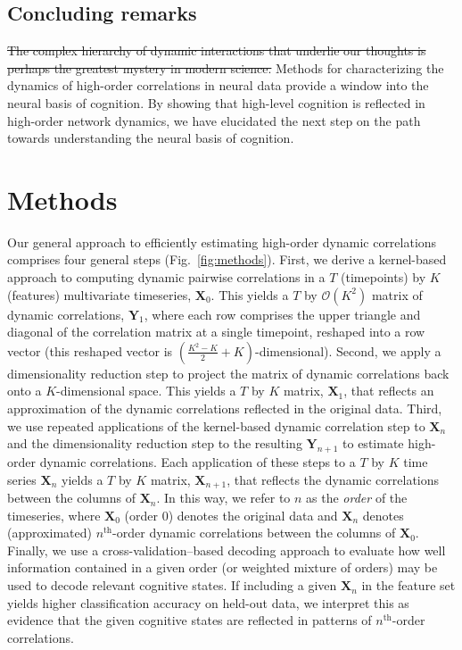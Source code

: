 \documentclass[english]{article}
\providecommand{\DIFdeltex}[1]{{\protect\color{red}\sout{#1}}}                      %
\providecommand{\DIFaddbegin}{} %
\providecommand{\DIFdelbegin}{} %
\providecommand{\DIFdelend}{} %
\providecommand{\DIFdel}[1]{\texorpdfstring{\DIFdeltex{#1}}{}} %
\newcommand{\DIFscaledelfig}{0.5}
\newlength{\DIFdelgraphicswidth} %
\newlength{\DIFdelgraphicsheight} %
\newcommand{\DIFaddincludegraphics}[2][]{{\color{blue}\fbox{\DIFOincludegraphics[#1]{#2}}}} %
\newcommand{\DIFdelincludegraphics}[2][]{%
\sbox{\DIFdelgraphicsbox}{\DIFOincludegraphics[#1]{#2}}%
\settoboxwidth{\DIFdelgraphicswidth}{\DIFdelgraphicsbox} %
\settoboxtotalheight{\DIFdelgraphicsheight}{\DIFdelgraphicsbox} %
\scalebox{\DIFscaledelfig}{%
\parbox[b]{\DIFdelgraphicswidth}{\usebox{\DIFdelgraphicsbox}\\[-\baselineskip] \rule{\DIFdelgraphicswidth}{0em}}\llap{\resizebox{\DIFdelgraphicswidth}{\DIFdelgraphicsheight}{%
\setlength{\unitlength}{\DIFdelgraphicswidth}%
\begin{picture}(1,1)%
\thicklines\linethickness{2pt} %
{\color[rgb]{1,0,0}\put(0,0){\framebox(1,1){}}}%
{\color[rgb]{1,0,0}\put(0,0){\line( 1,1){1}}}%
{\color[rgb]{1,0,0}\put(0,1){\line(1,-1){1}}}%
\end{picture}%
}\hspace*{3pt}}} %
} %
\DeclareRobustCommand{\DIFaddbegin}{\DIFOaddbegin \let\includegraphics\DIFaddincludegraphics} %
\DeclareRobustCommand{\DIFdelbegin}{\DIFOdelbegin \let\includegraphics\DIFdelincludegraphics} %
\DeclareRobustCommand{\DIFdelend}{\DIFOaddend \let\includegraphics\DIFOincludegraphics} %
\begin{document}
\subsection*{Concluding remarks}
\DIFdelbegin \DIFdel{The complex hierarchy of dynamic interactions that underlie our
thoughts is perhaps the greatest mystery in modern science.  }\DIFdelend Methods for characterizing the dynamics of high-order correlations in
neural data provide a window into the neural basis of cognition.  By
showing that high-level cognition is reflected in high-order network
dynamics, we have elucidated the next step on the path towards
understanding the neural basis of cognition.



\section*{Methods}
Our general approach to efficiently estimating high-order dynamic
correlations comprises four general steps (Fig.~\ref{fig:methods}).
First, we derive a kernel-based approach to computing dynamic pairwise
correlations in a $T$ (timepoints) by $K$ (features) multivariate
timeseries, $\mathbf{X}_0$.  This yields a $T$ by $\mathcal{O}(K^2)$
matrix of dynamic correlations, $\mathbf{Y}_1$, where each row
comprises the upper triangle and diagonal of the correlation matrix at a single
timepoint, reshaped into a row vector (this reshaped vector is
$\left( \frac{K^2 - K}{2} + K \right)$-dimensional).  Second, we apply a dimensionality
reduction step to project the matrix of dynamic correlations back onto
a $K$-dimensional space.  This yields a $T$ by $K$ matrix,
$\mathbf{X}_1$, that reflects an approximation of the dynamic
correlations reflected in the original data.  Third, we use repeated
applications of the kernel-based dynamic correlation step to
$\mathbf{X}_n$ and the dimensionality reduction step to the resulting
$\mathbf{Y}_{n+1}$ to estimate high-order dynamic correlations.  Each
application of these steps to a $T$ by $K$ time series $\mathbf{X}_n$
yields a $T$ by $K$ matrix, $\mathbf{X}_{n+1}$, that reflects the
dynamic correlations between the columns of $\mathbf{X}_n$.  In this
way, we refer to $n$ as the \textit{order} of the timeseries, where
$\mathbf{X}_0$ (order 0) denotes the original data and $\mathbf{X}_n$
denotes (approximated) $n^\mathrm{th}$-order dynamic correlations
between the columns of $\mathbf{X}_0$.  Finally, we use a
cross-validation--based decoding approach to evaluate how well
information contained in a given order (or weighted mixture of orders)
may be used to decode relevant cognitive states.  If including a given
$\mathbf{X}_n$ in the feature set yields higher classification
accuracy on held-out data, we interpret this as evidence that the
given cognitive states are reflected in patterns of
$n^\mathrm{th}$-order correlations.
\DIFaddbegin 
\end{document}
